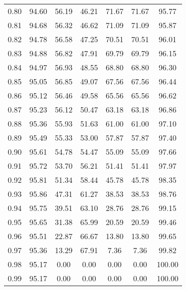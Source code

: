 \begin{tabular}{|c|c|c|c|c|c|c|}
      0.80 &     94.60 &     56.19 &      46.21 &   71.67 &      71.67 &         95.77 \\
      0.81 &     94.68 &     56.32 &      46.62 &   71.09 &      71.09 &         95.87 \\
      0.82 &     94.78 &     56.58 &      47.25 &   70.51 &      70.51 &         96.01 \\
      0.83 &     94.88 &     56.82 &      47.91 &   69.79 &      69.79 &         96.15 \\
      0.84 &     94.97 &     56.93 &      48.55 &   68.80 &      68.80 &         96.30 \\
      0.85 &     95.05 &     56.85 &      49.07 &   67.56 &      67.56 &         96.44 \\
      0.86 &     95.12 &     56.46 &      49.58 &   65.56 &      65.56 &         96.62 \\
      0.87 &     95.23 &     56.12 &      50.47 &   63.18 &      63.18 &         96.86 \\
      0.88 &     95.36 &     55.93 &      51.63 &   61.00 &      61.00 &         97.10 \\
      0.89 &     95.49 &     55.33 &      53.00 &   57.87 &      57.87 &         97.40 \\
      0.90 &     95.61 &     54.78 &      54.47 &   55.09 &      55.09 &         97.66 \\
      0.91 &     95.72 &     53.70 &      56.21 &   51.41 &      51.41 &         97.97 \\
      0.92 &     95.81 &     51.34 &      58.44 &   45.78 &      45.78 &         98.35 \\
      0.93 &     95.86 &     47.31 &      61.27 &   38.53 &      38.53 &         98.76 \\
      0.94 &     95.75 &     39.51 &      63.10 &   28.76 &      28.76 &         99.15 \\
      0.95 &     95.65 &     31.38 &      65.99 &   20.59 &      20.59 &         99.46 \\
      0.96 &     95.51 &     22.87 &      66.67 &   13.80 &      13.80 &         99.65 \\
      0.97 &     95.36 &     13.29 &      67.91 &    7.36 &       7.36 &         99.82 \\
      0.98 &     95.17 &      0.00 &       0.00 &    0.00 &       0.00 &        100.00 \\
      0.99 &     95.17 &      0.00 &       0.00 &    0.00 &       0.00 &        100.00 \\
\bottomrule
\end{tabular}
